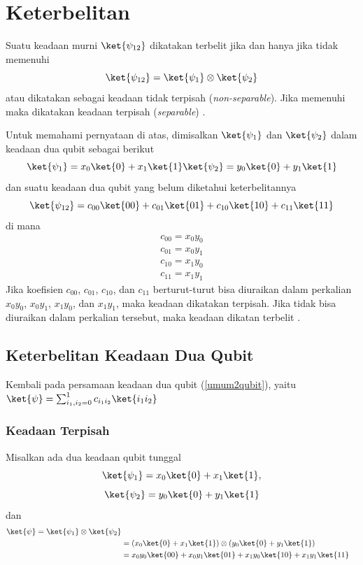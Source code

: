 \section{Keterbelitan}
\par
Suatu keadaan murni $\ket{\psi_{12}}$ dikatakan terbelit jika dan hanya jika tidak memenuhi
\begin{equation}
	\ket{\psi_{12}}=\ket{\psi_1}\otimes\ket{\psi_2}
\end{equation}
atau dikatakan sebagai keadaan tidak terpisah (\textit{non-separable}). Jika memenuhi maka dikatakan keadaan terpisah (\textit{separable}) \cite{esteve2004quantum}.
\par
Untuk memahami pernyataan di atas, dimisalkan $\ket{\psi_1}$ dan $\ket{\psi_2}$ dalam keadaan dua qubit sebagai berikut
\begin{equation}
		\ket{\psi_1}=x_0\ket{0}+x_1\ket{1}\\
		\ket{\psi_2}=y_0\ket{0}+y_1\ket{1}
\end{equation}
dan suatu keadaan dua qubit yang belum diketahui keterbelitannya
\begin{equation}
		\ket{\psi_{12}}=c_{00}\ket{00}+c_{01}\ket{01}+c_{10}\ket{10}+c_{11}\ket{11}
\end{equation}
di mana
\begin{align}
    c_{00}=x_0y_0
    \label{eq:terbelit1}\\
    c_{01}=x_0y_1
    \label{eq:terbelit2}\\
    c_{10}=x_1y_0
    \label{eq:terbelit3}\\
    c_{11}=x_1y_1
    \label{eq:terbelit4}
\end{align}
Jika koefisien $c_{00}$, $c_{01}$, $c_{10}$, dan $c_{11}$ berturut-turut bisa diuraikan dalam perkalian $x_0y_0$, $x_0y_1$, $x_1y_0$, dan $x_1y_1$, maka keadaan dikatakan terpisah. Jika tidak bisa diuraikan dalam perkalian tersebut, maka keadaan dikatan terbelit \cite{taufiqi2024asymmetric}.
\subsection{Keterbelitan Keadaan Dua Qubit}
Kembali pada persamaan keadaan dua qubit (\ref{umum2qubit}), yaitu $\ket{\psi}=\sum_{i_1,i_2=0}^{1} c_{i_1 i_2} \ket{i_1 i_2}$
\subsubsection{Keadaan Terpisah}
Misalkan ada dua keadaan qubit tunggal
\begin{equation}
	\ket{\psi_1}=x_0\ket{0}+x_1\ket{1},
\end{equation}
\begin{equation}
	\ket{\psi_2}=y_0\ket{0}+y_1\ket{1}
\end{equation}
dan
\begin{align}
	\ket{\psi}=\ket{\psi_1}\otimes\ket{\psi_2}\\
	&=(x_0\ket{0}+x_1\ket{1})\otimes(y_0\ket{0}+y_1\ket{1})\\
	&=x_0y_0\ket{00}+x_0y_1\ket{01}+x_1y_0\ket{10}+x_1y_1\ket{11}
\end{align}


